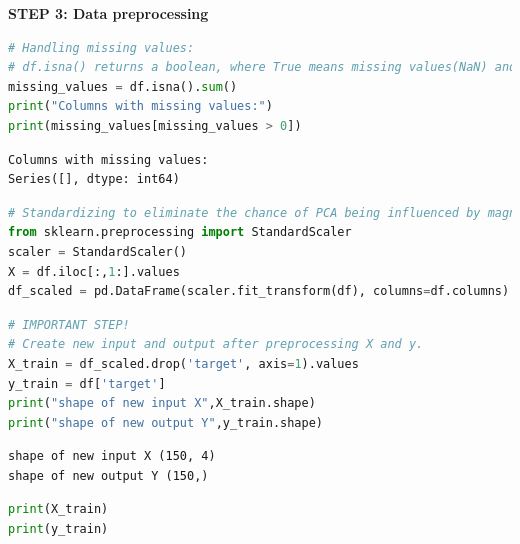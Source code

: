 \documentclass[
]{article}
\begin{document}
\textbf{STEP 3: Data preprocessing}

\begin{lstlisting}[language=Python]
# Handling missing values:
# df.isna() returns a boolean, where True means missing values(NaN) and .sum() sums the values along each column
missing_values = df.isna().sum()
print("Columns with missing values:")
print(missing_values[missing_values > 0])
\end{lstlisting}

\begin{lstlisting}
Columns with missing values:
Series([], dtype: int64)
\end{lstlisting}

\begin{lstlisting}[language=Python]
# Standardizing to eliminate the chance of PCA being influenced by magnitude of some features' values.
from sklearn.preprocessing import StandardScaler
scaler = StandardScaler()
X = df.iloc[:,1:].values
df_scaled = pd.DataFrame(scaler.fit_transform(df), columns=df.columns)
\end{lstlisting}

\begin{lstlisting}[language=Python]
# IMPORTANT STEP!
# Create new input and output after preprocessing X and y.
X_train = df_scaled.drop('target', axis=1).values
y_train = df['target']
print("shape of new input X",X_train.shape)
print("shape of new output Y",y_train.shape)
\end{lstlisting}

\begin{lstlisting}
shape of new input X (150, 4)
shape of new output Y (150,)
\end{lstlisting}

\begin{lstlisting}[language=Python]
print(X_train)
print(y_train)
\end{lstlisting}
\end{document}
